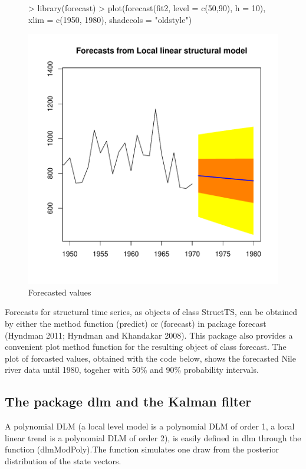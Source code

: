 \documentclass[10pt, a4paper]{article} %
\begin{document}
\begin{figure}[H]
\centering
\begin{Schunk}
\begin{Sinput}
> library(forecast)
> plot(forecast(fit2, level = c(50,90), h = 10), xlim = c(1950, 1980), 
      shadecols = "oldstyle")
\end{Sinput}
\end{Schunk}
\includegraphics{FINAL_VERSION-forecasted_values}
\caption{Forecasted values}
\label{forecast_values}
\end{figure}

\noindent Forecasts for structural time series, as objects of class StructTS, can be obtained by either the method function (predict) or (forecast) in package forecast (Hyndman 2011; Hyndman and Khandakar 2008). This package also provides a convenient plot method function for the resulting object of class forecast. The plot of forcasted values, obtained with the code below, shows the forecasted Nile river data until 1980, togeher with 50\% and 90\% probability intervals.

\subsection{The package dlm and the Kalman filter}
\noindent A polynomial DLM (a local level model is a polynomial DLM of order 1, a local linear trend is a polynomial DLM of order 2), is easily defined in dlm through the function (dlmModPoly).The function simulates one draw from the posterior distribution of the state vectors.
\end{document}
